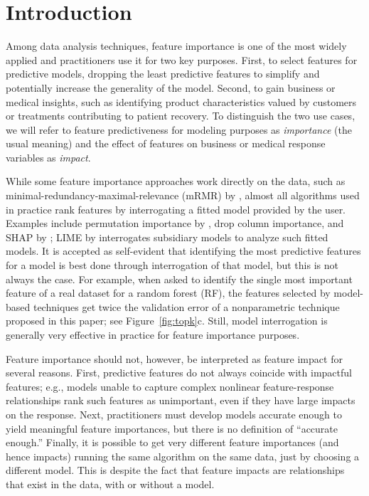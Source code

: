 \documentclass[11pt]{article}
\newcommand{\figref}[1]{Figure~\ref{#1}}
\newcommand{\todo}[1]{{{\small\color{red}{[#1]}}}}
\newcommand{\Impo}{\fontfamily{cmr}\textsc{Import}}
\newcommand{\simp}{\fontfamily{cmr}\textsc{\small StratImpact}}
\begin{document}
\section{Introduction}
\label{sec:intro}

\todo{
check \simp vs \Impo is confusing

Check, what is $R^2$?

We are back to just training data now.  all tests use 20 and 20 for hyper parameters. boston too little data; don't filter out anything: min samples per x = 1. one trial
}

Among data analysis techniques, feature importance is one of the most widely applied and practitioners use it for two key purposes. First, to select features for predictive models, dropping the least predictive features to simplify and potentially increase the generality of the model. Second, to gain business or medical insights, such as identifying product characteristics valued by customers or treatments contributing to patient recovery.  To distinguish the two use cases, we will refer to feature predictiveness for modeling purposes as {\em importance} (the usual meaning) and the effect of features on business or medical response variables as {\em impact}.

While some feature importance approaches work directly on the data, such as minimal-redundancy-maximal-relevance (mRMR) by \cite{mRMR}, almost all algorithms used in practice rank features by interrogating a fitted model provided by the user.  Examples include permutation importance by \cite{RF}, drop column importance, and SHAP by \cite{shap}; LIME by \cite{lime} interrogates subsidiary models to analyze such fitted models. It is accepted as self-evident that identifying the most predictive features for a model is best done through interrogation of that  model, but this is not always the case.  For example, when asked to identify the single most important feature of a real dataset \citep{bulldozer} for a random forest (RF), the features selected by model-based techniques get twice the validation error of a nonparametric technique proposed in this paper; see \figref{fig:topk}c. Still, model interrogation is generally very effective in practice for feature importance purposes.

Feature importance should not, however, be interpreted as feature impact for several reasons. First, predictive features do not always coincide with impactful features; e.g., models unable to capture complex nonlinear feature-response relationships rank such features as unimportant, even if they have large impacts on the response. Next, practitioners must develop models accurate enough to yield meaningful feature importances, but there is no definition of ``accurate enough.'' Finally, it is possible to get very different feature importances (and hence impacts) running the same algorithm on the same data, just by choosing a different model. This is despite the fact that feature impacts are relationships that exist in the data, with or without a model.
\end{document}
